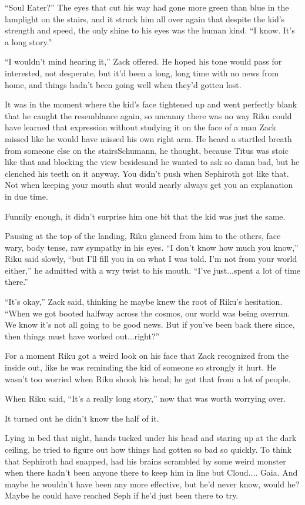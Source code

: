 ``Soul Eater?'' The eyes that cut his way had gone more green than blue in the lamplight on the stairs, and it struck him all over again that despite the kid's strength and speed, the only shine to his eyes was the human kind. ``I know. It's a long story.''

``I wouldn't mind hearing it,'' Zack offered. He hoped his tone would pass for interested, not desperate, but it'd been a long, long time with no news from home, and things hadn't been going well when they'd gotten lost.

It was in the moment where the kid's face tightened up and went perfectly blank that he caught the resemblance again, so uncanny there was no way Riku could have learned that expression without studying it on the face of a man Zack missed like he would have missed his own right arm. He heard a startled breath from someone else on the stairs\textemdash Schumann, he thought, because Titus was stoic like that and blocking the view besides\textemdash and he wanted to ask so damn bad, but he clenched his teeth on it anyway. You didn't push when Sephiroth got like that. Not when keeping your mouth shut would nearly always get you an explanation in due time.

Funnily enough, it didn't surprise him one bit that the kid was just the same.

Pausing at the top of the landing, Riku glanced from him to the others, face wary, body tense, raw sympathy in his eyes. ``I don't know how much you know,'' Riku said slowly, ``but I'll fill you in on what I was told. I'm not from your world either,'' he admitted with a wry twist to his mouth. ``I've just...spent a lot of time there.''

``It's okay,'' Zack said, thinking he maybe knew the root of Riku's hesitation. ``When we got booted halfway across the cosmos, our world was being overrun. We know it's not all going to be good news. But if you've been back there since, then things must have worked out...right?''

For a moment Riku got a weird look on his face that Zack recognized from the inside out, like he was reminding the kid of someone so strongly it hurt. He wasn't too worried when Riku shook his head; he got that from a lot of people.

When Riku said, ``It's a really long story,'' now that was worth worrying over.

It turned out he didn't know the half of it.

Lying in bed that night, hands tucked under his head and staring up at the dark ceiling, he tried to figure out how things had gotten so bad so quickly. To think that Sephiroth had snapped, had his brains scrambled by some weird monster when there hadn't been anyone there to keep him in line but Cloud.... Gaia. And maybe he wouldn't have been any more effective, but he'd never know, would he? Maybe he could have reached Seph if he'd just been there to try.

